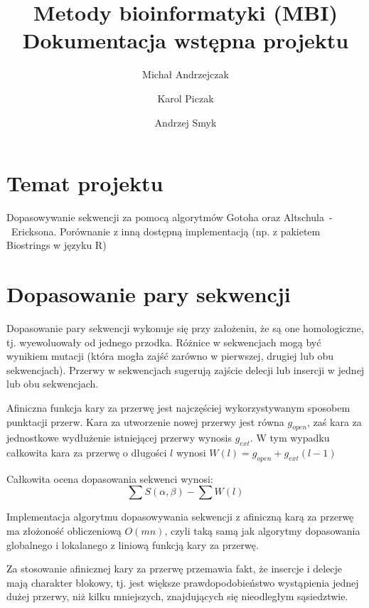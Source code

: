 \documentclass[a4paper,10pt]{article}
\title{Metody bioinformatyki (MBI)\\Dokumentacja wstępna projektu}
\author{Michał Andrzejczak
		\and
		Karol Piczak
		\and
		Andrzej Smyk
		}
\begin{document}
	\maketitle
	\section{Temat projektu}

	\indent Dopasowywanie sekwencji za pomocą algorytmów Gotoha oraz \linebreak\mbox{Altschula - Ericksona}. Porównanie z inną dostępną implementacją (np. z pakietem Biostrings w języku R)

	\section{Dopasowanie pary sekwencji}

	Dopasowanie pary sekwencji wykonuje się przy założeniu, że są one homologiczne, tj. wyewoluowały od jednego przodka. Różnice w sekwencjach mogą być wynikiem mutacji (która mogła zajść zarówno w pierwszej, drugiej lub obu sekwencjach). Przerwy w sekwencjach sugerują zajście delecji lub insercji w jednej lub obu sekwencjach.

	Afiniczna funkcja kary za przerwę jest najczęściej wykorzystywanym sposobem punktacji przerw. Kara za utworzenie nowej przerwy jest równa $g_{open}$, zaś kara za jednostkowe wydłużenie istniejącej przerwy wynosis $g_{ext}$. W tym wypadku całkowita kara za przerwę o długości $l$ wynosi \mbox{$W(l) = g_{open} + g_{ext}(l - 1)$}

	Całkowita ocena dopasowania sekwenci wynosi:
	\[\sum S(\alpha, \beta) - \sum W(l) \]

	Implementacja algorytmu dopasowywania sekwencji z afiniczną karą za przerwę ma złożoność obliczeniową $O(mn)$, czyli taką samą jak algorytmy dopasowania globalnego i lokalanego z liniową funkcją kary za przerwę.

	Za stosowanie afinicznej kary za przerwę przemawia fakt, że insercje i delecje mają charakter blokowy, tj. jest większe prawdopodobieństwo wystąpienia jednej dużej przerwy, niż kilku mniejszych, znajdujących się nieodległym sąsiedztwie.
\end{document}
